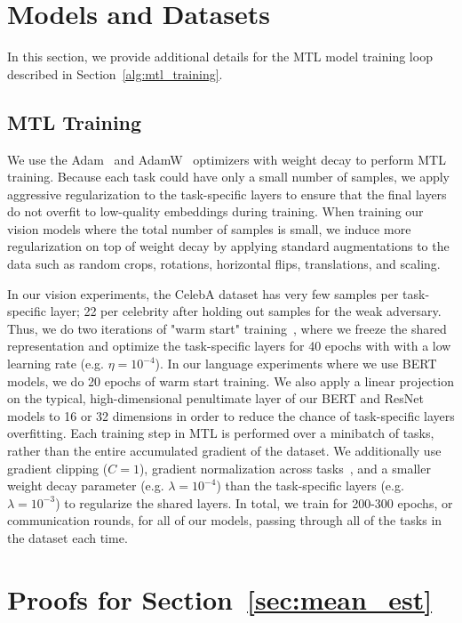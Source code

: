 \section{Models and Datasets}

In this section, we provide additional details for the MTL model training loop described in Section~\ref{alg:mtl_training}. 

\subsection{MTL Training} \label{appdx:training}

We use the Adam~\cite{kingma-2015-adam} and AdamW~\cite{loshchilov-2017-adamw} optimizers with weight decay to perform MTL training. Because each task could have only a small number of samples, we apply aggressive regularization to the task-specific layers to ensure that the final layers do not overfit to low-quality embeddings during training. When training our vision models where the total number of samples is small, we induce more regularization on top of weight decay by applying standard augmentations to the data such as random crops, rotations, horizontal flips, translations, and scaling. 

In our vision experiments, the CelebA dataset has very few samples per task-specific layer; 22 per celebrity after holding out samples for the weak adversary. Thus, we do two iterations of "warm start" training~\cite{nguyen-2023-flwarmup}, where we freeze the shared representation and optimize the task-specific layers for 40 epochs with with a low learning rate (e.g. $\eta = 10^{-4}$).  In our language experiments where we use BERT models, we do 20 epochs of warm start training. We also apply a linear projection on the typical, high-dimensional penultimate layer of our BERT and ResNet models to 16 or 32 dimensions in order to reduce the chance of task-specific layers overfitting. Each training step in MTL is performed over a minibatch of tasks, rather than the entire accumulated gradient of the dataset. We additionally use gradient clipping ($C = 1$), gradient normalization across tasks~\cite{chen-2018-gradnormalization}, and a smaller weight decay parameter (e.g. $\lambda = 10^{-4}$) than the task-specific layers (e.g. $\lambda = 10^{-3}$) to regularize the shared layers. In total, we train for 200-300 epochs, or communication rounds, for all of our models, passing through all of the tasks in the dataset each time.


\section{Proofs for Section~\ref{sec:mean_est}} \label{sec:proofs}

